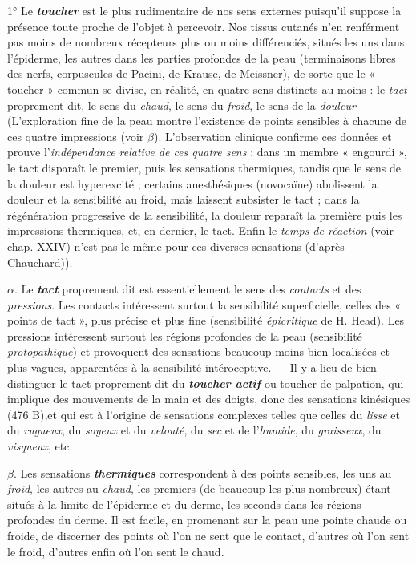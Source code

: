 1° Le \textbf{\textit {toucher}} est le plus rudimentaire de nos sens externes puisqu'il
suppose la présence toute proche de l’objet à percevoir. Nos tissus cutanés
n’en renférment pas moins de nombreux récepteurs plus ou moins
différenciés, situés les uns dans l’épiderme, les autres dans les parties
profondes de la peau (terminaisons libres des nerfs, corpuscules de
Pacini, de Krause, de Meissner), de sorte que le « toucher » commun
se divise, en réalité, en quatre sens distincts au moins : le {\it tact} proprement
dit, le sens du {\it chaud}, le sens du {\it froid}, le sens de la {\it douleur}
{\scriptsize (L'exploration fine de la peau montre l’existence de points sensibles à chacune de
ces quatre impressions (voir $\beta$). L'observation clinique confirme ces données et prouve
l'{\it indépendance relative de ces quatre sens} : dans un membre « engourdi », le tact disparaît
le premier, puis les sensations thermiques, tandis que le sens de la douleur est hyperexcité ;
certains anesthésiques (novocaïne) abolissent la douleur et la sensibilité au
froid, mais laissent subsister le tact ; dans la régénération progressive de la sensibilité,
la douleur reparaît la première puis les impressions thermiques, et, en dernier, le tact.
Enfin le {\it temps de réaction} (voir chap. XXIV) n’est pas le même pour ces diverses sensations
(d’après Chauchard))}.

$\alpha$. Le \textbf{\textit {tact}} proprement dit est essentiellement le sens des {\it contacts}
et des {\it pressions}. Les contacts intéressent surtout la sensibilité superficielle,
celles des « points de tact », plus précise et plus fine (sensibilité
{\it épicritique} de H. Head). Les pressions intéressent surtout les
régions profondes de la peau (sensibilité {\it protopathique}) et provoquent
des sensations beaucoup moins bien localisées et plus vagues, apparentées
à la sensibilité intéroceptive. — Il y a lieu de bien distinguer
le tact proprement dit du \textbf{\textit {toucher actif}} ou toucher de palpation,
qui implique des mouvements de la main et des doigts, donc des
sensations kinésiques (476 B),et qui est à l’origine de sensations
complexes telles que celles du {\it lisse} et du {\it rugueux}, du {\it soyeux} et du
{\it velouté}, du {\it sec} et de l’{\it humide}, du {\it graisseux}, du {\it visqueux}, etc.

$\beta$. Les sensations \textbf{\textit {thermiques}} correspondent à des points sensibles,
les uns au {\it froid}, les autres au {\it chaud}, les premiers (de beaucoup les
plus nombreux) étant situés à la limite de l’épiderme et du derme, les
seconds dans les régions profondes du derme. Il est facile, en promenant
sur la peau une pointe chaude ou froide, de discerner des points
où l’on ne sent que le contact, d’autres où l’on sent le froid, d’autres
enfin où l’on sent le chaud.

